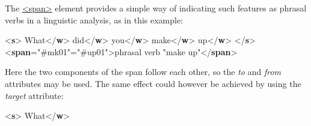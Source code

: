 The \hyperref[TEI.span]{<span>} element provides a simple way of indicating such features as phrasal verbs in a linguistic analysis, as in this example: \par\bgroup{}\exampleFont \begin{shaded}\noindent\mbox{}{<\textbf{s}>}\mbox{}\newline 
{}What{</\textbf{w}>}\mbox{}\newline 
{}did{</\textbf{w}>}\mbox{}\newline 
{}you{</\textbf{w}>}\mbox{}\newline 
{}make{</\textbf{w}>}\mbox{}\newline 
{}up{</\textbf{w}>}\mbox{}\newline 
{</\textbf{s}>}\mbox{}\newline 
{<\textbf{span}\hspace*{1em}{from}="{\#mk01}"\hspace*{1em}{to}="{\#up01}">}phrasal verb "make up"{</\textbf{span}>}\end{shaded}\egroup\par \noindent  Here the two components of the span follow each other, so the {\itshape to} and {\itshape from} attributes may be used. The same effect could however be achieved by using the {\itshape target} attribute: \par\bgroup{}\exampleFont \begin{shaded}\noindent\mbox{}{<\textbf{s}>}\mbox{}\newline 
{}What{</\textbf{w}>}\mbox{}\newline 

\end{shaded}
